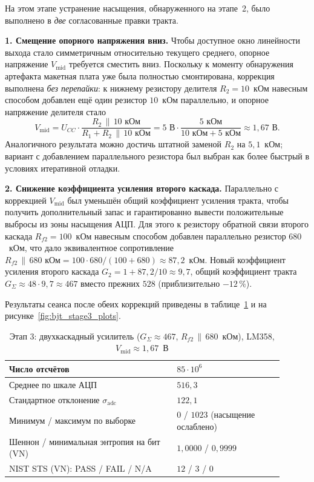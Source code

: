 
На этом этапе устранение насыщения, обнаруженного на этапе~2, было выполнено в
\emph{две} согласованные правки тракта.

\textbf{1. Смещение опорного напряжения вниз.} Чтобы доступное окно линейности
выхода стало симметричным относительно текущего среднего, опорное напряжение
$V_\mathrm{mid}$ требуется сместить вниз. Поскольку к моменту обнаружения
артефакта макетная плата уже была полностью смонтирована, коррекция выполнена
\emph{без перепайки}: к нижнему резистору делителя $R_2=10$~кОм навесным
способом добавлен ещё один резистор $10$~кОм параллельно, и опорное напряжение
делителя стало
\begin{equation}
  V_\mathrm{mid}
  = U_{CC}\cdot\dfrac{R_2\,\|\,10\text{ кОм}}{R_1+R_2\,\|\,10\text{ кОм}}
  = 5\text{ В}\cdot\dfrac{5\text{ кОм}}{10\text{ кОм}+5\text{ кОм}}
  \approx 1{,}67\text{ В}.
\end{equation}
Аналогичного результата можно достичь штатной заменой $R_2$ на $5{,}1$~кОм;
вариант с добавлением параллельного резистора был выбран как более быстрый в
условиях итеративной отладки.

\textbf{2. Снижение коэффициента усиления второго каскада.} Параллельно с
коррекцией $V_\mathrm{mid}$ был уменьшён общий коэффициент усиления тракта,
чтобы получить дополнительный запас и гарантированно вывести положительные
выбросы из зоны насыщения АЦП. Для этого к резистору обратной связи второго
каскада $R_{f2}=100$~кОм навесным способом добавлен параллельно резистор
$680$~кОм, что дало эквивалентное сопротивление
$R_{f2}\,\|\,680\text{ кОм} = 100\!\cdot\!680/(100+680) \approx 87{,}2$~кОм.
Новый коэффициент усиления второго каскада
$G_2 = 1 + 87{,}2/10 \approx 9{,}7$, общий коэффициент тракта
$G_\Sigma \approx 48\cdot 9{,}7 \approx 467$ вместо прежних $528$
(приблизительно $-12\,\%$).

Результаты сеанса после обеих коррекций приведены в
таблице~\ref{tab:bjt_stage3_summary} и на рисунке~\ref{fig:bjt_stage3_plots}.

\begin{table}[H]
  \centering
  \footnotesize
  \caption{Этап 3: двухкаскадный усилитель ($G_\Sigma\approx 467$,
  $R_{f2}\,\|\,680$~кОм), LM358, $V_\mathrm{mid}\approx 1{,}67$~В}
  \label{tab:bjt_stage3_summary}
  \begin{tabular}{|p{0.55\linewidth}|p{0.35\linewidth}|}
    \hline
    Число отсчётов & $85\cdot 10^6$ \\
    \hline
    Среднее по шкале АЦП & $516{,}3$ \\
    \hline
    Стандартное отклонение $\sigma_\mathrm{adc}$ & $122{,}1$ \\
    \hline
    Минимум / максимум по выборке & $0$ / $1023$ (насыщение ослаблено) \\
    \hline
    Шеннон / минимальная энтропия на бит (VN) & $1{,}0000$ / $0{,}9999$ \\
    \hline
    NIST STS (VN): PASS / FAIL / N/A & $12$ / $3$ / $0$ \\
    \hline
  \end{tabular}
\end{table}

